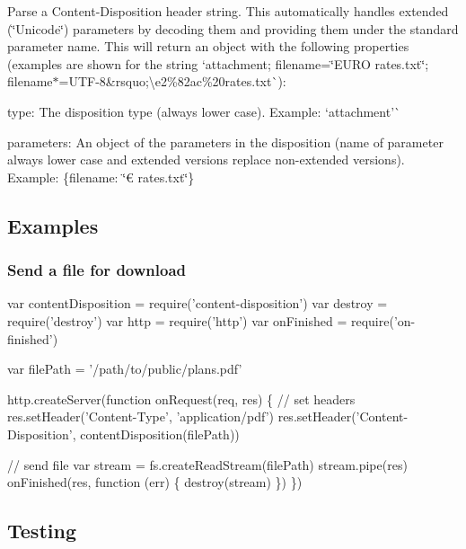 Parse a {\ttfamily Content-\/\+Disposition} header string. This automatically handles extended (\char`\"{}\+Unicode\char`\"{}) parameters by decoding them and providing them under the standard parameter name. This will return an object with the following properties (examples are shown for the string `\textquotesingle{}attachment; filename=\char`\"{}\+E\+U\+R\+O rates.\+txt\char`\"{}; filename$\ast$=U\+T\+F-\/8\&rsquo;\textbackslash{}\textquotesingle{}e2\%82ac\%20rates.\+txt\textquotesingle{}\`{})\+:


\begin{DoxyItemize}
\item {\ttfamily type}\+: The disposition type (always lower case). Example\+: `\textquotesingle{}attachment'\`{}
\item {\ttfamily parameters}\+: An object of the parameters in the disposition (name of parameter always lower case and extended versions replace non-\/extended versions). Example\+: {\ttfamily \{filename\+: \char`\"{}€ rates.\+txt\char`\"{}\}}
\end{DoxyItemize}

\subsection*{Examples}

\subsubsection*{Send a file for download}


\begin{DoxyCode}
var contentDisposition = require('content-disposition')
var destroy = require('destroy')
var http = require('http')
var onFinished = require('on-finished')

var filePath = '/path/to/public/plans.pdf'

http.createServer(function onRequest(req, res) \{
  // set headers
  res.setHeader('Content-Type', 'application/pdf')
  res.setHeader('Content-Disposition', contentDisposition(filePath))

  // send file
  var stream = fs.createReadStream(filePath)
  stream.pipe(res)
  onFinished(res, function (err) \{
    destroy(stream)
  \})
\})
\end{DoxyCode}


\subsection*{Testing}


